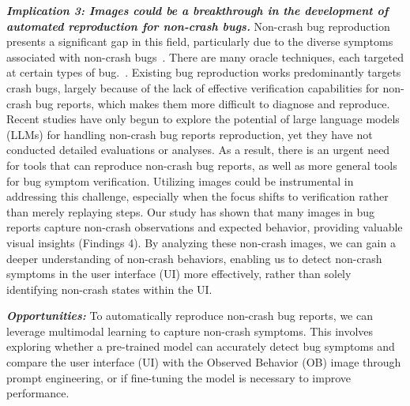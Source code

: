 \noindent
\textbf{\emph{Implication 3: Images could be a breakthrough in the development of automated reproduction for non-crash bugs.}} Non-crash bug reproduction presents a significant gap in this field, particularly due to the diverse symptoms associated with non-crash bugs~\cite{xiong2023empirical, wang2022detecting, wang2024feedback, baral2024automating}. There are many oracle techniques, each targeted at certain types of bug.~\cite{baral2024automating, su2021owleyes, guo2022ifixdataloss, sun2021setdroid, su2021fully, wang2022detecting, escobar2020empirical, fazzini2017automated, ju2024study}. Existing bug reproduction works predominantly targets crash bugs, largely because of the lack of effective verification capabilities for non-crash bug reports, which makes them more difficult to diagnose and reproduce. Recent studies have only begun to explore the potential of large language models (LLMs) for handling non-crash bug reports reproduction, yet they have not conducted detailed evaluations or analyses. 
As a result, there is an urgent need for tools that can reproduce non-crash bug reports, as well as more general tools for bug symptom verification. Utilizing images could be instrumental in addressing this challenge, especially when the focus shifts to verification rather than merely replaying steps. Our study has shown that many images in bug reports capture non-crash observations and expected behavior, providing valuable visual insights (Findings 4). By analyzing these non-crash images, we can gain a deeper understanding of non-crash behaviors, enabling us to detect non-crash symptoms in the user interface (UI) more effectively, rather than solely identifying non-crash states within the UI.

\textbf{\textit{Opportunities:}} 
To automatically reproduce non-crash bug reports, we can leverage multimodal learning to capture non-crash symptoms. This involves exploring whether a pre-trained model can accurately detect bug symptoms and compare the user interface (UI) with the Observed Behavior (OB) image through prompt engineering, or if fine-tuning the model is necessary to improve performance.



